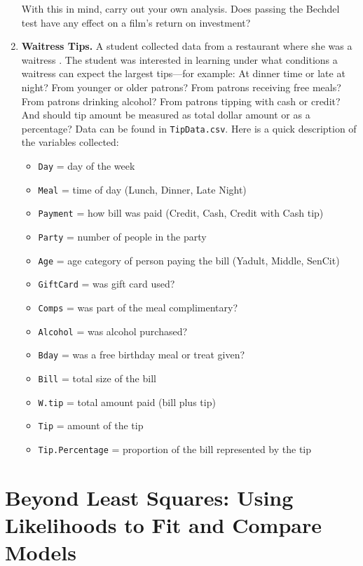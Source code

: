 \documentclass[
]{krantz}
\providecommand{\tightlist}{%
  \setlength{\itemsep}{0pt}\setlength{\parskip}{0pt}}
\begin{document}
\begin{enumerate}
  With this in mind, carry out your own analysis. Does passing the Bechdel test have any effect on a film's return on investment?
\item
  \textbf{Waitress Tips.} A student collected data from a restaurant where she was a waitress \citep{Dahlquist2011}. The student was interested in learning under what conditions a waitress can expect the largest tips---for example: At dinner time or late at night? From younger or older patrons? From patrons receiving free meals? From patrons drinking alcohol? From patrons tipping with cash or credit? And should tip amount be measured as total dollar amount or as a percentage? Data can be found in \texttt{TipData.csv}. Here is a quick description of the variables collected:

  \begin{itemize}
  \tightlist
  \item
    \texttt{Day} = day of the week
  \item
    \texttt{Meal} = time of day (Lunch, Dinner, Late Night)
  \item
    \texttt{Payment} = how bill was paid (Credit, Cash, Credit with Cash tip)
  \item
    \texttt{Party} = number of people in the party
  \item
    \texttt{Age} = age category of person paying the bill (Yadult, Middle, SenCit)
  \item
    \texttt{GiftCard} = was gift card used?
  \item
    \texttt{Comps} = was part of the meal complimentary?
  \item
    \texttt{Alcohol} = was alcohol purchased?
  \item
    \texttt{Bday} = was a free birthday meal or treat given?
  \item
    \texttt{Bill} = total size of the bill
  \item
    \texttt{W.tip} = total amount paid (bill plus tip)
  \item
    \texttt{Tip} = amount of the tip
  \item
    \texttt{Tip.Percentage} = proportion of the bill represented by the tip
  \end{itemize}
\end{enumerate}

\hypertarget{ch-beyondmost}{%
\chapter{Beyond Least Squares: Using Likelihoods to Fit and Compare Models}\label{ch-beyondmost}}
\end{document}
